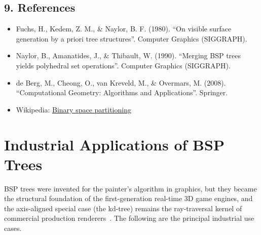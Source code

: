 \subsection{9. References}
\begin{itemize}
    \item Fuchs, H., Kedem, Z. M., \& Naylor, B. F. (1980). ``On visible surface generation by a priori tree structures''. Computer Graphics (SIGGRAPH).
    \item Naylor, B., Amanatides, J., \& Thibault, W. (1990). ``Merging BSP trees yields polyhedral set operations''. Computer Graphics (SIGGRAPH).
    \item de Berg, M., Cheong, O., van Kreveld, M., \& Overmars, M. (2008). ``Computational Geometry: Algorithms and Applications''. Springer.
    \item Wikipedia: \href{https://en.wikipedia.org/wiki/Binary_space_partitioning}{Binary space partitioning}
\end{itemize}

\section{Industrial Applications of BSP Trees}
\label{sec:bsp_applications}

BSP trees were invented for the painter's algorithm in graphics, but they
became the structural foundation of the first-generation real-time 3D game
engines, and the axis-aligned special case (the kd-tree) remains the
ray-traversal kernel of commercial production renderers~\cite{fuchs1980,naylor1990}.
The following are the principal industrial use cases.

